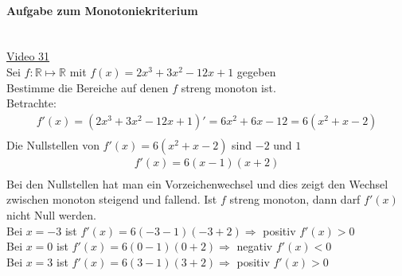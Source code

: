 \paragraph{Aufgabe zum Monotoniekriterium}$   $\vspace*{3mm}\\
\href{https://youtu.be/E2T-2jXem2Y}{Video 31}\\
Sei $ f:\mathbb{R}\longmapsto \mathbb{R} $ mit $ f(x)=2x^3+3x^2-12x+1 $ gegeben\\
Bestimme die Bereiche auf denen $ f $ streng monoton ist.\vspace*{2mm}\\
Betrachte:\\
\begin{align*}
f'(x)=(2x^3+3x^2-12x+1)'=6x^2+6x-12=6(x^2+x-2)\\
\end{align*}
Die Nullstellen von $ f'(x) =6(x^2+x-2)$ sind $ -2 $ und $ 1 $ \\
\begin{align*}
f'(x)=6(x-1)(x+2)\\
\end{align*}
Bei den Nullstellen hat man ein Vorzeichenwechsel und dies zeigt den Wechsel zwischen  monoton steigend und fallend. Ist $ f $ streng monoton, dann darf $ f'(x) $ nicht Null werden.\vspace*{2mm}\\
Bei $ x=-3 $ ist $ f'(x)=6(-3-1)(-3+2)\Rightarrow $ positiv $ f'(x)>0 $\\
Bei $ x=0 $ ist $ f'(x)=6(0-1)(0+2)\Rightarrow $ negativ $ f'(x)<0 $\\
Bei $ x=3 $ ist $ f'(x)=6(3-1)(3+2)\Rightarrow $ positiv $ f'(x)>0 $\\
\begin{center}
	
	\\
\end{center}
